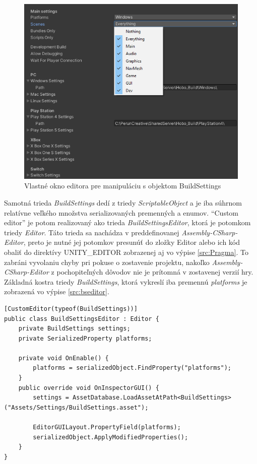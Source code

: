 \documentclass[slovak, bachelorpractice]{diploma}
\begin{document}
\begin{figure}[!htbp]
	\centering
	\includegraphics[width=.90\textwidth]{Pictures/buildDetail.png}
	\caption{Vlastné okno editora pre manipuláciu s objektom BuildSettings}
	\label{pic:Custom}
\end{figure}

Samotná trieda \textit{BuildSettings} dedí z triedy \textit{ScriptableObject} a je iba súhrnom relatívne veľkého množstva serializovaných premenných a enumov. \enquote{Custom editor} je potom realizovaný ako trieda \textit{BuildSettingsEditor}, ktorá je potomkom triedy \textit{Editor}. Táto trieda sa nachádza v preddefinovanej \textit{Assembly-CSharp-Editor}, preto je nutné jej potomkov presunúť do zložky Editor alebo ich kód obaliť do direktívy UNITY\_EDITOR zobrazenej aj vo výpise \ref{src:Pragma}. To zabráni vyvolaniu chyby pri pokuse o zostavenie projektu, nakoľko \textit{Assembly-CSharp-Editor} z pochopiteľných dôvodov nie je prítomná v zostavenej verzií hry. Základná kostra triedy \textit{BuildSettings}, ktorá vykreslí iba premennú \textit{platforms} je zobrazená vo výpise \ref{src:bseditor}.

\vspace{10pt}
\begin{lstlisting}[label=src:bseditor,caption={Kostra triedy určenej pre vykreslenie vlastného okna v editore Unity}]
[CustomEditor(typeof(BuildSettings))]
public class BuildSettingsEditor : Editor {
    private BuildSettings settings;
    private SerializedProperty platforms;
    
    private void OnEnable() {
        platforms = serializedObject.FindProperty("platforms");
    }
    public override void OnInspectorGUI() {
        settings = AssetDatabase.LoadAssetAtPath<BuildSettings>("Assets/Settings/BuildSettings.asset");
        
        EditorGUILayout.PropertyField(platforms);
        serializedObject.ApplyModifiedProperties();
    }
}
\end{lstlisting}
\end{document}
